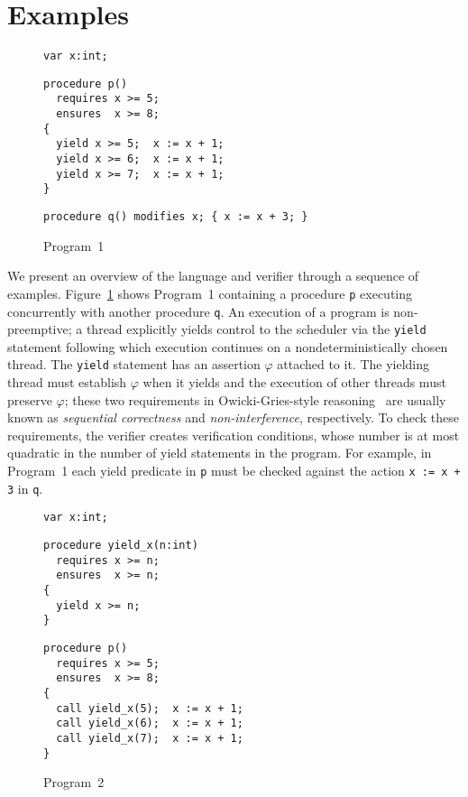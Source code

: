 \section{Examples}
\label{sec:examples}

\begin{figure}
\begin{verbatim}
var x:int;
\end{verbatim}
\begin{verbatim}
procedure p()
  requires x >= 5;
  ensures  x >= 8;
{
  yield x >= 5;  x := x + 1;
  yield x >= 6;  x := x + 1;
  yield x >= 7;  x := x + 1;
}
\end{verbatim}
\begin{verbatim}
procedure q() modifies x; { x := x + 3; }
\end{verbatim}
\caption{Program~1}
\label{fig:ex1}
\end{figure}

We present an overview of the \civl language and verifier through a sequence of examples.
Figure~\ref{fig:ex1} shows Program~1 containing a procedure {\tt p}
executing concurrently with another procedure {\tt q}. 
An execution of a \civl program is non-preemptive; a thread explicitly yields control to the
scheduler via the {\tt yield} statement following which execution continues on a 
nondeterministically chosen thread.
The {\tt yield} statement has an assertion $\varphi$ attached to it.
The yielding thread must establish $\varphi$ when it yields and the execution of other threads 
must preserve $\varphi$; these two requirements in Owicki-Gries-style
reasoning~\cite{OwickiG76} are usually known as {\em sequential correctness}
and {\em non-interference}, respectively.
To check these requirements, the \civl verifier creates verification conditions, whose number is at most
quadratic in the number of yield statements in the program.
For example, in Program~1 each yield predicate in {\tt p} must be checked against the action 
{\tt x := x + 3} in {\tt q}.

\begin{figure}
\begin{verbatim}
var x:int;
\end{verbatim}
\begin{verbatim}
procedure yield_x(n:int)
  requires x >= n;
  ensures  x >= n;
{
  yield x >= n;
}
\end{verbatim}
\begin{verbatim}
procedure p()
  requires x >= 5;
  ensures  x >= 8;
{
  call yield_x(5);  x := x + 1;
  call yield_x(6);  x := x + 1;
  call yield_x(7);  x := x + 1;
}
\end{verbatim}
\caption{Program~2}
\label{fig:ex2}
\end{figure}

